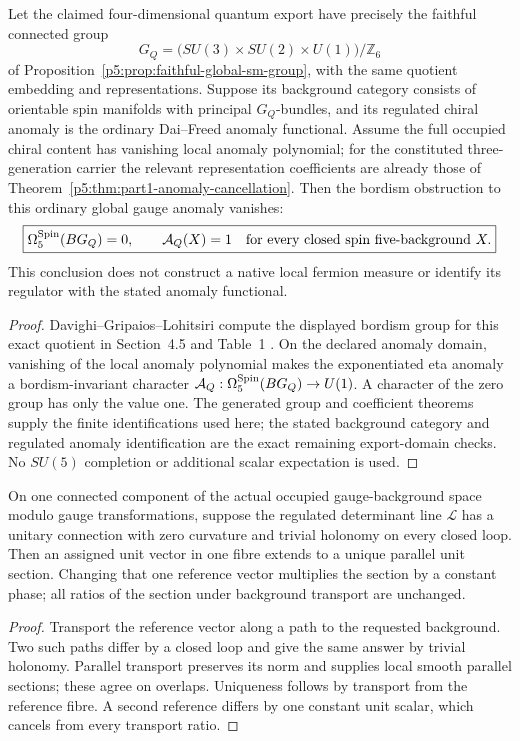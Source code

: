 \documentclass[12pt,a4paper]{article}
\begin{document}
\begin{theorem}
\label{p5:thm:v2210-lit-anomaly-obstruction}
Let the claimed four-dimensional quantum export have precisely the faithful
connected group
\[
 G_Q=\bigl(SU(3)\times SU(2)\times U(1)\bigr)/\mathbb Z_6
\]
of Proposition~\ref{p5:prop:faithful-global-sm-group}, with the same quotient
embedding and representations.  Suppose its background category consists
of orientable spin manifolds with principal \(G_Q\)-bundles, and its
regulated chiral anomaly is the ordinary Dai--Freed anomaly functional.
Assume the full occupied chiral content has vanishing local anomaly
polynomial; for the constituted three-generation carrier the relevant
representation coefficients are already those of
Theorem~\ref{p5:thm:part1-anomaly-cancellation}.
Then the bordism obstruction to this ordinary global gauge anomaly vanishes:
\[
 \boxed{\Omega_5^{\rm Spin}(BG_Q)=0,
 \qquad \mathcal A_Q(X)=1\quad
 \text{for every closed spin five-background }X.}
\]
This conclusion does not construct a native local fermion measure or
identify its regulator with the stated anomaly functional.
\end{theorem}
\begin{proof}
Davighi--Gripaios--Lohitsiri compute the displayed bordism group for this
exact quotient in Section~4.5 and Table~1
\cite{LitSMGlobalAnomaly2020}.  On the declared anomaly domain, vanishing
of the local anomaly polynomial makes the exponentiated eta anomaly a
bordism-invariant character
\(\mathcal A_Q:\Omega_5^{\rm Spin}(BG_Q)\to U(1)\).  A character of the
zero group has only the value one.  The generated group and coefficient
theorems supply the finite identifications used here; the stated background
category and regulated anomaly identification are the exact remaining
export-domain checks.  No \(SU(5)\) completion or additional scalar
expectation is used.
\end{proof}

\begin{proposition}
\label{p5:prop:v2210-lit-measure-transport}
On one connected component of the actual occupied gauge-background space
modulo gauge transformations, suppose the regulated determinant line
\(\mathcal L\) has a unitary connection with zero curvature and trivial
holonomy on every closed loop.  Then an assigned unit vector in one fibre
extends to a unique parallel unit section.  Changing that one reference
vector multiplies the section by a constant phase; all ratios of the section
under background transport are unchanged.
\end{proposition}
\begin{proof}
Transport the reference vector along a path to the requested background.
Two such paths differ by a closed loop and give the same answer by trivial
holonomy.  Parallel transport preserves its norm and supplies local smooth
parallel sections; these agree on overlaps.  Uniqueness follows by transport
from the reference fibre.  A second reference differs by one constant unit
scalar, which cancels from every transport ratio.
\end{proof}
\end{document}
